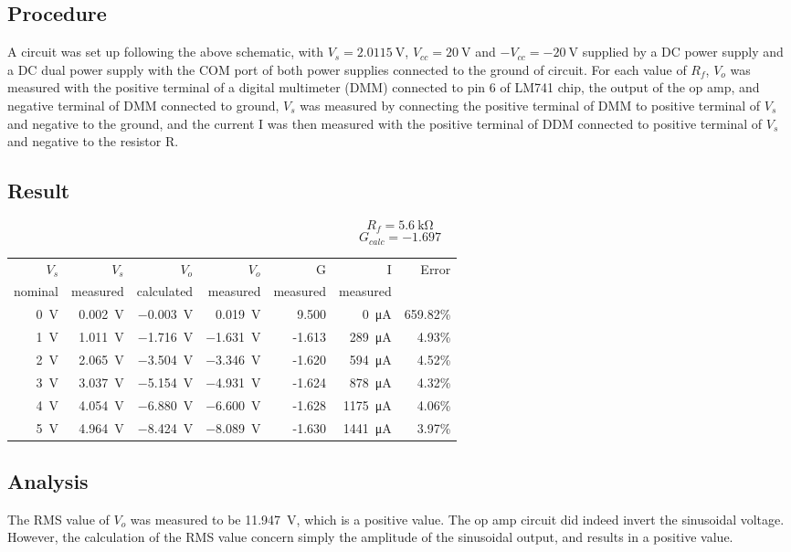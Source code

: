 \documentclass{article}
\begin{document}
\subsection*{Procedure}
A circuit was set up following the above schematic, with $V_s=\SI{2.0115}{\volt}$, $V_{cc}=\SI{20}{\volt}$ and $-V_{cc}=-\SI{20}{\volt}$ supplied by a DC power supply and a DC dual power supply with the COM port of both power supplies connected to the ground of circuit. For each value of $R_f$, $V_o$ was measured with the positive terminal of a digital multimeter (DMM) connected to pin 6 of LM741 chip, the output of the op amp, and negative terminal of DMM connected to ground, $V_s$ was measured by connecting the positive terminal of DMM to positive terminal of $V_s$ and negative to the ground, and the current I was then measured with the positive terminal of DDM connected to positive terminal of $V_s$ and negative to the resistor R.

\pagebreak

\subsection*{Result}
$$R_f=\SI{5.6}{\kilo\ohm}$$
$$G_{calc}=-1.697$$
\begin{table}[H]
\centering
    \begin{tabular}{@{}r r r r r r r@{}}
         \toprule
        $V_s$ &$V_s$ &$V_o$ &$V_o$ & G &  I &Error\\
         nominal & measured&calculated & measured & measured& measured&  \\
         \midrule
\SI{0}{\volt} & \SI{0.002}{\volt} & \SI{-0.003}{\volt} &  \SI{0.019}{\volt} &  9.500 & \SI{0}{\micro\ampere} & 659.82\% \\
\SI{1}{\volt} & \SI{1.011}{\volt} & \SI{-1.716}{\volt} & \SI{-1.631}{\volt} & -1.613 & \SI{289}{\micro\ampere} & 4.93\% \\
\SI{2}{\volt} & \SI{2.065}{\volt} & \SI{-3.504}{\volt} & \SI{-3.346}{\volt} & -1.620 & \SI{594}{\micro\ampere} & 4.52\% \\
\SI{3}{\volt} & \SI{3.037}{\volt} & \SI{-5.154}{\volt} & \SI{-4.931}{\volt} & -1.624 & \SI{878}{\micro\ampere} & 4.32\% \\
\SI{4}{\volt} & \SI{4.054}{\volt} & \SI{-6.880}{\volt} & \SI{-6.600}{\volt} & -1.628 & \SI{1175}{\micro\ampere} & 4.06\% \\
\SI{5}{\volt} & \SI{4.964}{\volt} & \SI{-8.424}{\volt} & \SI{-8.089}{\volt} & -1.630 & \SI{1441}{\micro\ampere} & 3.97\% \\ 

         \bottomrule
    \end{tabular}
\end{table}

\subsection*{Analysis}
The RMS value of $V_o$ was measured to be \SI{11.947}{\volt}, which is a positive value. The op amp circuit did indeed invert the sinusoidal voltage. However, the calculation of the RMS value concern simply the amplitude of the sinusoidal output, and results in a positive value. 
\end{document}
